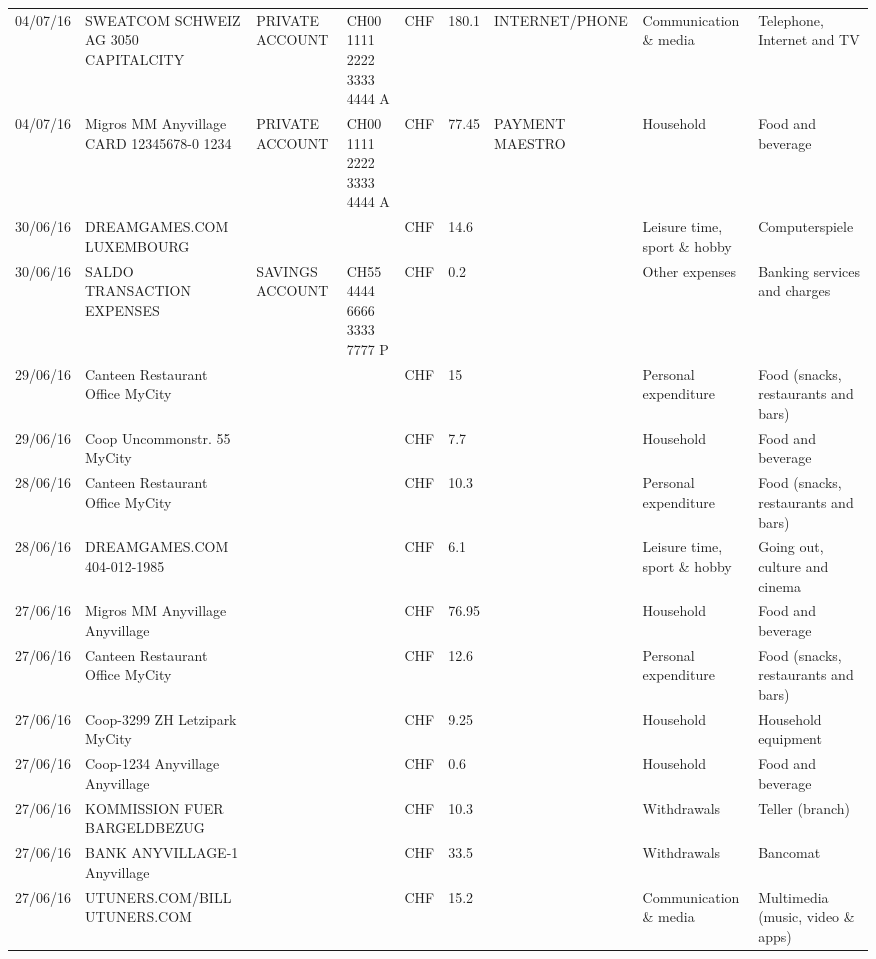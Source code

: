 \begin{landscape}
\begin{adjustwidth}{-2cm}{-2cm}
\begin{tiny}
\begin{longtable}{lp{4cm}llllp{3cm}ll}
		04/07/16 & SWEATCOM SCHWEIZ AG 3050 CAPITALCITY & PRIVATE ACCOUNT & CH00 1111 2222 3333 4444 A & CHF   & 180.1 & INTERNET/PHONE & Communication \& media & Telephone,  Internet and TV \\
		04/07/16 & Migros MM Anyvillage CARD 12345678-0 1234 & PRIVATE ACCOUNT & CH00 1111 2222 3333 4444 A & CHF   & 77.45 & PAYMENT MAESTRO & Household & Food and beverage \\
		30/06/16 & DREAMGAMES.COM           LUXEMBOURG &       &       & CHF   & 14.6  &       & Leisure time, sport \& hobby & Computerspiele \\
		30/06/16 & SALDO TRANSACTION EXPENSES & SAVINGS ACCOUNT & CH55 4444 6666 3333 7777 P & CHF   & 0.2   &       & Other expenses & Banking services and charges \\
		29/06/16 & Canteen Restaurant Office      MyCity &       &       & CHF   & 15    &       & Personal expenditure & Food (snacks, restaurants and bars) \\
		29/06/16 & Coop Uncommonstr. 55   MyCity &       &       & CHF   & 7.7   &       & Household & Food and beverage \\
		28/06/16 & Canteen Restaurant Office      MyCity &       &       & CHF   & 10.3  &       & Personal expenditure & Food (snacks, restaurants and bars) \\
		28/06/16 & DREAMGAMES.COM           404-012-1985 &       &       & CHF   & 6.1   &       & Leisure time, sport \& hobby & Going out, culture and cinema \\
		27/06/16 & Migros MM Anyvillage    Anyvillage &       &       & CHF   & 76.95 &       & Household & Food and beverage \\
		27/06/16 & Canteen Restaurant Office      MyCity &       &       & CHF   & 12.6  &       & Personal expenditure & Food (snacks, restaurants and bars) \\
		27/06/16 & Coop-3299 ZH Letzipark   MyCity &       &       & CHF   & 9.25  &       & Household & Household equipment \\
		27/06/16 & Coop-1234 Anyvillage    Anyvillage &       &       & CHF   & 0.6   &       & Household & Food and beverage \\
		27/06/16 & KOMMISSION FUER BARGELDBEZUG &       &       & CHF   & 10.3  &       & Withdrawals & Teller (branch) \\
		27/06/16 & BANK ANYVILLAGE-1        Anyvillage &       &       & CHF   & 33.5  &       & Withdrawals & Bancomat \\
		27/06/16 & UTUNERS.COM/BILL          UTUNERS.COM &       &       & CHF   & 15.2  &       & Communication \& media & Multimedia (music, video \& apps) \\

\end{longtable}
\end{tiny}
\end{adjustwidth}
\end{landscape}

